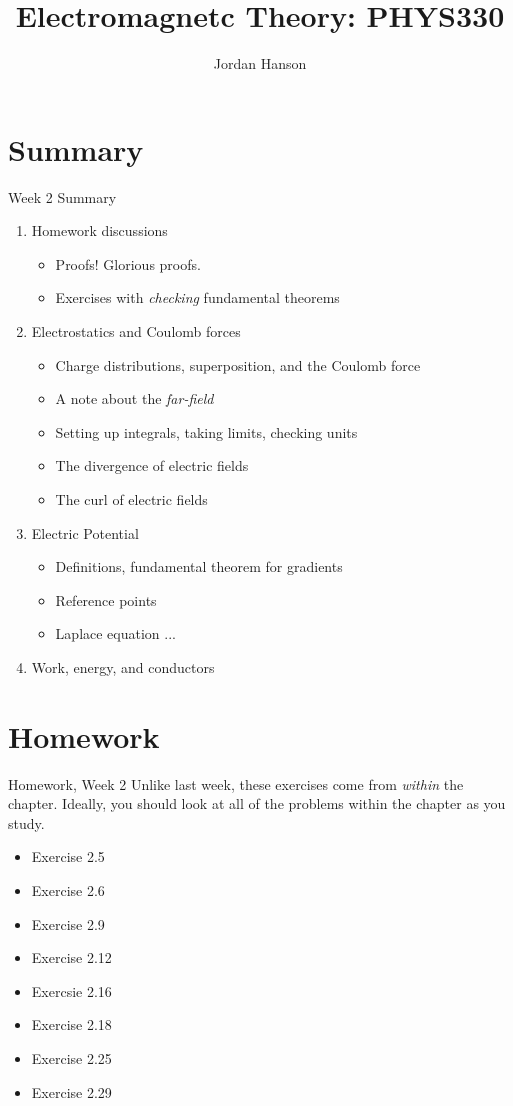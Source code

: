 \documentclass{beamer}
\title{Electromagnetc Theory: PHYS330}
\author{Jordan Hanson}
\institute{Whittier College Department of Physics and Astronomy}
\begin{document}
\maketitle

\section{Summary}

\begin{frame}{Week 2 Summary}
\begin{enumerate}
\item Homework discussions
\begin{itemize}
\item Proofs!  Glorious proofs.
\item Exercises with \textit{checking} fundamental theorems
\end{itemize}
\item Electrostatics and Coulomb forces
\begin{itemize}
\item Charge distributions, superposition, and the Coulomb force
\item A note about the \textit{far-field}
\item Setting up integrals, taking limits, checking units
\item The divergence of electric fields
\item The curl of electric fields
\end{itemize}
\item Electric Potential
\begin{itemize}
\item Definitions, fundamental theorem for gradients
\item Reference points
\item Laplace equation ...
\end{itemize}
\item Work, energy, and conductors
\end{enumerate}
\end{frame}

\section{Homework}

\begin{frame}{Homework, Week 2}
Unlike last week, these exercises come from \textit{within} the chapter.  Ideally, you should look at all of the problems within the chapter as you study.
\begin{itemize}
\item Exercise 2.5
\item Exercise 2.6
\item Exercise 2.9
\item Exercise 2.12
\item Exercsie 2.16
\item Exercise 2.18
\item Exercise 2.25
\item Exercise 2.29
\end{itemize}
\end{frame}
\end{document}
